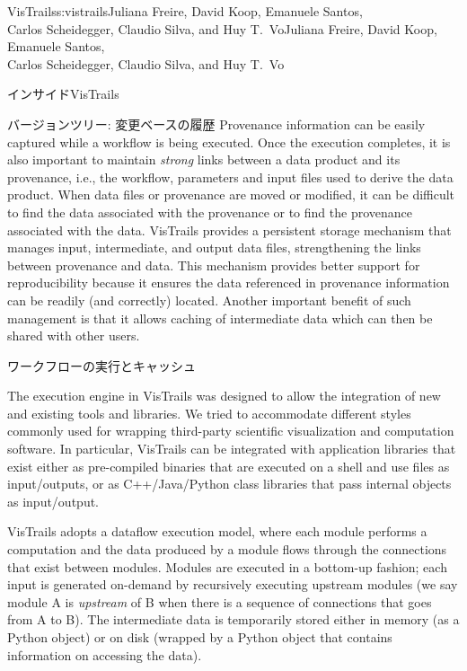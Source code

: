 \begin{aosachaptertoc}{VisTrails}{s:vistrails}{Juliana Freire, David Koop, Emanuele Santos, \\ Carlos Scheidegger, Claudio Silva, and Huy T.\ Vo}{Juliana Freire, David Koop, Emanuele Santos, \\ \hspace*{0.9cm} Carlos Scheidegger, Claudio Silva, and Huy T.\ Vo}
\begin{aosasect1}{インサイドVisTrails}
\begin{aosasect2}{バージョンツリー: 変更ベースの履歴}
Provenance information can be easily captured while a workflow
is being executed. Once the execution completes, it is also important
to maintain \emph{strong} links between a data product and its
provenance, i.e., the workflow, parameters and input files used to
derive the data product. When data files or provenance are moved or
modified, it can be difficult to find the data associated with the
provenance or to find the provenance associated with the data.
VisTrails provides a persistent storage mechanism that manages input,
intermediate, and output data files, strengthening the links between
provenance and data.  This mechanism provides better support for
reproducibility because it ensures the data referenced in provenance
information can be readily (and correctly) located.  Another important
benefit of such management is that it allows caching of intermediate
data which can then be shared with other users.

\end{aosasect2}

\begin{aosasect2}{ワークフローの実行とキャッシュ}
\label{sec.vistrails.exec-cache}

The execution engine in VisTrails was designed to allow the
integration of new and existing tools and libraries.  We tried to
accommodate different styles commonly used for wrapping third-party
scientific visualization and computation software. In particular,
VisTrails can be integrated with application libraries that exist
either as pre-compiled binaries that are executed on a shell and use
files as input/outputs, or as C++/Java/Python class libraries that
pass internal objects as input/output.

VisTrails adopts a dataflow execution model, where each module
performs a computation and the data produced by a module flows through
the connections that exist between modules. Modules are executed in a
bottom-up fashion; each input is generated on-demand by recursively
executing upstream modules (we say module A is \emph{upstream} of B
when there is a sequence of connections that goes from A to B).  The
intermediate data is temporarily stored either in memory (as a Python
object) or on disk (wrapped by a Python object that contains
information on accessing the data).


\end{aosasect2}
\end{aosasect1}
\end{aosachaptertoc}
